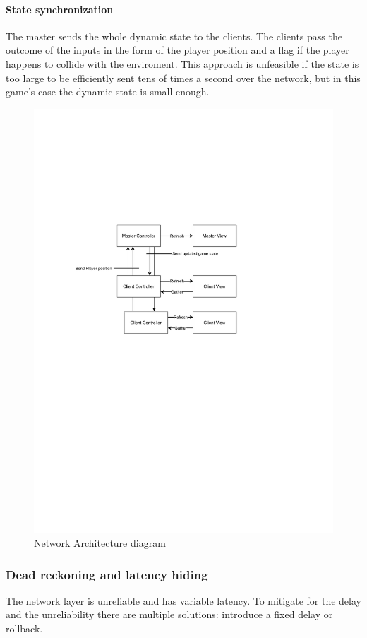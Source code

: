 \documentclass[12pt]{article}
\begin{document}
\paragraph{State synchronization}
The master sends the whole dynamic state to the clients. The clients pass the outcome of the inputs in the form of the player position and a flag if the player happens to collide with the enviroment. This approach is unfeasible if the state is too large to be efficiently sent tens of times a second over the network, but in this game's case the dynamic state is small enough.
\smallskip
\begin{figure}[H]
\includegraphics[width=\textwidth]{net architecture}
\caption{Network Architecture diagram}
\end{figure}
\smallskip

\subsubsection{Dead reckoning and latency hiding}
The network layer is unreliable and has variable latency. To mitigate for the delay and the unreliability there are multiple solutions: introduce a fixed delay or rollback.
\end{document}
